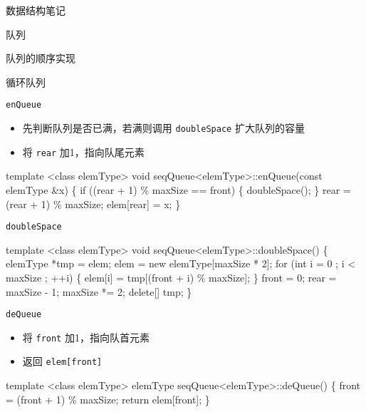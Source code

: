 \documentclass[
  ignorenonframetext,
]{beamer}
\newenvironment{Shaded}{}{}
\newcommand{\NormalTok}[1]{#1}
\providecommand{\tightlist}{%
  \setlength{\itemsep}{0pt}\setlength{\parskip}{0pt}}
\begin{document}
\begin{frame}[fragile]{数据结构笔记}
\begin{block}{队列}
\begin{block}{队列的顺序实现}
\begin{block}{循环队列}
\begin{block}{\texttt{enQueue}}
\protect{}\label{enqueue}
\begin{itemize}
\tightlist
\item
  先判断队列是否已满，若满则调用 \texttt{doubleSpace} 扩大队列的容量
\item
  将 \texttt{rear} 加1，指向队尾元素
\end{itemize}

\begin{Shaded}
\begin{Highlighting}[]
\NormalTok{template \textless{}class elemType\textgreater{}}
\NormalTok{void seqQueue\textless{}elemType\textgreater{}::enQueue(const elemType \&x)}
\NormalTok{\{}
\NormalTok{  if ((rear + 1) \% maxSize == front)}
\NormalTok{  \{}
\NormalTok{    doubleSpace();}
\NormalTok{  \}}
\NormalTok{  rear = (rear + 1) \% maxSize;}
\NormalTok{  elem[rear] = x;}
\NormalTok{\}}
\end{Highlighting}
\end{Shaded}
\end{block}

\begin{block}{\texttt{doubleSpace}}
\protect{}\label{doublespace-1}
\begin{Shaded}
\begin{Highlighting}[]
\NormalTok{template \textless{}class elemType\textgreater{}}
\NormalTok{void seqQueue\textless{}elemType\textgreater{}::doubleSpace()}
\NormalTok{\{}
\NormalTok{  elemType *tmp = elem;}
\NormalTok{  elem = new elemType[maxSize * 2];}
\NormalTok{  for (int i = 0 ; i \textless{} maxSize ; ++i)}
\NormalTok{  \{}
\NormalTok{    elem[i] = tmp[(front + i) \% maxSize];}
\NormalTok{  \}}
\NormalTok{  front = 0;}
\NormalTok{  rear = maxSize {-} 1;}
\NormalTok{  maxSize *= 2;}
\NormalTok{  delete[] tmp;}
\NormalTok{\}}
\end{Highlighting}
\end{Shaded}
\end{block}

\begin{block}{\texttt{deQueue}}
\protect{}\label{dequeue}
\begin{itemize}
\tightlist
\item
  将 \texttt{front} 加1，指向队首元素
\item
  返回 \texttt{elem{[}front{]}}
\end{itemize}

\begin{Shaded}
\begin{Highlighting}[]
\NormalTok{template \textless{}class elemType\textgreater{}}
\NormalTok{elemType seqQueue\textless{}elemType\textgreater{}::deQueue()}
\NormalTok{\{}
\NormalTok{  front = (front + 1) \% maxSize;}
\NormalTok{  return elem[front];}
\NormalTok{\}}
\end{Highlighting}
\end{Shaded}
\end{block}


\end{block}
\end{block}
\end{block}
\end{frame}
\end{document}
